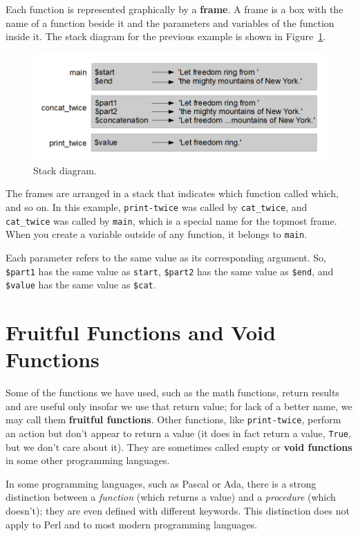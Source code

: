 Each function is represented graphically by a {\bf frame}.  A frame 
is a box with the name of a function beside it and the parameters 
and variables of the function inside it.  The stack diagram for 
the previous example is shown in Figure~\ref{fig.stack}.

\begin{figure}
\centerline
{\includegraphics[scale=1.2]{figs/stack_diagram.png}}
\caption{Stack diagram.}
\label{fig.stack}
\end{figure}


The frames are arranged in a stack that indicates which function
called which, and so on.  In this example, \verb"print-twice"
was called by \verb"cat_twice", and \verb"cat_twice" was called by 
\verb"main", which is a special name for the topmost frame.  When
you create a variable outside of any function, it belongs to 
\verb"main".

Each parameter refers to the same value as its corresponding
argument.  So, {\tt \$part1} has the same value as
{\tt start}, {\tt \$part2} has the same value as {\tt \$end},
and {\tt \$value} has the same value as {\tt \$cat}.


\section{Fruitful Functions and Void Functions}

Some of the functions we have used, such as the 
math functions, return results and are useful only insofar 
we use that return value; for lack of a better name, we 
may call them {\bf fruitful functions}.  Other functions, 
like \verb"print-twice", perform an action but don't appear 
to return a value (it does in fact return a value, {\tt True}, 
but we don't care about it).  They are sometimes called empty or 
{\bf void functions} in some other programming languages.

In some programming languages, such as Pascal or Ada, there 
is a strong distinction between a \emph{function} (which 
returns a value) and a \emph{procedure} (which doesn't); 
they are even defined with different keywords. This 
distinction does not apply to Perl and to most modern 
programming languages.

